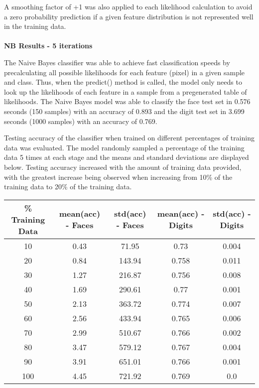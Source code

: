 \documentclass[11pt]{article}
\begin{document}
    A smoothing factor of +1 was also applied to each likelihood calculation to avoid a zero probability prediction if a given feature distribution is not represented well in the training data.\\\\
    \large
    \textbf{NB Results - 5 iterations}
    \normalsize

    The Naive Bayes classifier was able to achieve fast classification speeds by precalculating all possible likelihoods for each feature (pixel) in a given sample and class. Thus, when the predict() method is called, the model only needs to look up the likelihoods of each feature in a sample from a pregenerated table of likelihoods. The Naive Bayes model was able to classify the face test set in 0.576 seconds (150 samples) with an accuracy of 0.893 and the digit test set in 3.699 seconds (1000 samples) with an accuracy of 0.769.

    Testing accuracy of the classifier when trained on different percentages of training data was evaluated. The model randomly sampled a percentage of the training data 5 times at each stage and the means and standard deviations are displayed below. Testing accuracy increased with the amount of training data provided, with the greatest increase being observed when increasing from 10\% of the training data to 20\% of the training data.

    \begin{center}
    \begin{tabular}{||c|c c|c c||}
     \hline
     \% Training Data & mean(acc) - Faces & std(acc) - Faces & mean(acc) - Digits & std(acc) - Digits \\ [0.5ex]
     \hline\hline
     10 & 0.43 & 71.95 & 0.73 & 0.004\\
     \hline
     20 & 0.84 & 143.94 & 0.758 & 0.011\\
     \hline
     30 & 1.27 & 216.87 & 0.756 & 0.008\\
     \hline
     40 & 1.69 & 290.61 & 0.77 & 0.001\\
     \hline
     50 & 2.13 & 363.72 & 0.774 & 0.007\\
     \hline
     60 & 2.56 & 433.94 & 0.765 & 0.006\\
     \hline
     70 & 2.99 & 510.67 & 0.766 & 0.002\\
     \hline
     80 & 3.47 & 579.12 & 0.767 & 0.004\\
     \hline
     90 & 3.91 & 651.01 & 0.766 & 0.001\\
     \hline
     100 & 4.45 & 721.92 & 0.769 & 0.0\\
     \hline
    \end{tabular}
    \end{center}
\end{document}
